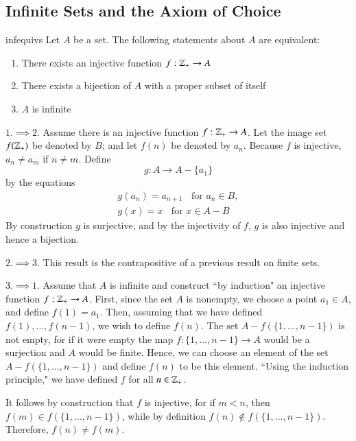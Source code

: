 \documentclass[12pt, a4paper, twoside, openright, titlepage]{book}
\begin{document}
\begin{appendices}
    \section{Infinite Sets and the Axiom of Choice}


    \begin{thm}{}{infequivs}
        Let $A$ be a set. The following statements about $A$ are equivalent:\begin{enumerate}
            \item There exists an injective function $f:\mathbb Z_+\rightarrow A$
            \item There exists a bijection of $A$ with a proper subset of itself
            \item $A$ is infinite
        \end{enumerate}
    \end{thm}
    \begin{proof*}{}{}
        $1.\implies 2.$ Assume there is an injective function $f:\mathbb Z_+\rightarrow A$. Let the image set $f(\mathbb Z_+)$ be denoted by $B$; and let $f(n)$ be denoted by $a_n$. Because $f$ is injective, $a_n\neq a_m$ if $n \neq m$. Define \begin{equation*}
            g:A\rightarrow A-\{a_1\}
        \end{equation*}
        by the equations \begin{align*}
            g(a_n) = a_{n+1}\;\;\text{ for }a_n \in B, \\
            g(x) = x\;\;\text{ for } x \in A-B
        \end{align*}
        By construction $g$ is surjective, and by the injectivity of $f$, $g$ is also injective and hence a bijection.

        $2.\implies 3.$ This result is the contrapositive of a previous result on finite sets.


        $3.\implies 1.$ Assume that $A$ is infinite and construct ``by induction" an injective function $f:\mathbb Z_+\rightarrow A$. First, since the set $A$ is nonempty, we choose a point $a_1 \in A$, and define $f(1) = a_1$. Then, assuming that we have defined $f(1),...,f(n-1)$, we wish to define $f(n)$. The set $A-f(\{1,...,n-1\})$ is not empty, for if it were empty the map $f:\{1,...,n-1\}\rightarrow A$ would be a surjection and $A$ would be finite. Hence, we can choose an element of the set $A-f(\{1,...,n-1\})$ and define $f(n)$ to be this element. ``Using the induction principle," we have defined $f$ for all $n \in \mathbb Z_+$.

        It follows by construction that $f$ is injective, for if $m < n$, then $f(m) \in f(\{1,...,n-1\})$, while by definition $f(n) \notin f(\{1,...,n-1\})$. Therefore, $f(n) \neq f(m)$.
    \end{proof*}


\end{appendices}
\end{document}
